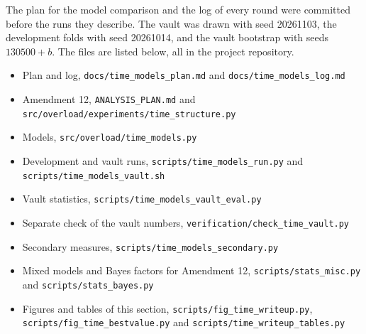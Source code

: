\documentclass[11pt]{article}
\begin{document}
The plan for the model comparison and the log of every round were committed before the runs they describe. The vault was drawn with seed 20261103, the development folds with seed 20261014, and the vault bootstrap with seeds $130500 + b$. The files are listed below, all in the project repository.

{\raggedright
\begin{itemize}\setlength{\itemsep}{0pt}
\item Plan and log, \texttt{docs/time\_models\_plan.md} and \texttt{docs/time\_models\_log.md}
\item Amendment 12, \texttt{ANALYSIS\_PLAN.md} and \texttt{src/overload/experiments/time\_structure.py}
\item Models, \texttt{src/overload/time\_models.py}
\item Development and vault runs, \texttt{scripts/time\_models\_run.py} and \texttt{scripts/time\_models\_vault.sh}
\item Vault statistics, \texttt{scripts/time\_models\_vault\_eval.py}
\item Separate check of the vault numbers, \texttt{verification/check\_time\_vault.py}
\item Secondary measures, \texttt{scripts/time\_models\_secondary.py}
\item Mixed models and Bayes factors for Amendment 12, \texttt{scripts/stats\_misc.py} and \texttt{scripts/stats\_bayes.py}
\item Figures and tables of this section, \texttt{scripts/fig\_time\_writeup.py}, \texttt{scripts/fig\_time\_bestvalue.py} and \texttt{scripts/time\_writeup\_tables.py}
\end{itemize}
}
\end{document}
